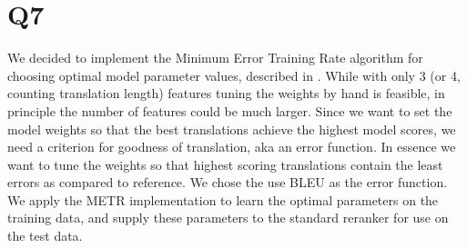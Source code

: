 \section*{Q7}
We decided to implement the Minimum Error Training Rate algorithm for choosing optimal model parameter values, described in \cite{och2003}. While with only 3 (or 4, counting translation length) features tuning the weights by hand is feasible, in principle the number of features could be much larger. Since we want to set the model weights so that the best translations achieve the highest model scores, we need a criterion for goodness of translation, aka an error function. In essence we want to tune the weights so that highest scoring translations contain the least errors as compared to reference. We chose the use BLEU as the error function. We apply the METR implementation to learn the optimal parameters on the training data, and supply these parameters to the standard reranker for use on the test data.
